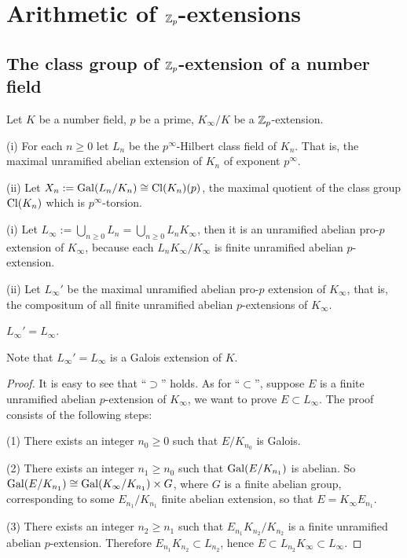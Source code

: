 \section{Arithmetic of ${\mathbb {Z}}_p$-extensions}

\subsection{The class group of ${\mathbb {Z}}_p$-extension of a number field}

Let $K$ be a number field, $p$ be a prime,
$K_\infty/K$ be a ${\mathbb {Z}}_p$-extension.

\begin{definition}
\label{Zp-ext-Ln}
{\rm(i)}
For each $n\geq 0$ let $L_n$ be the $p^\infty$-Hilbert class field of $K_n$.
That is, the maximal unramified abelian extension of $K_n$ of exponent $p^\infty$.

{\rm(ii)}
Let $X_n:={\mathrm{Gal}}(L_n/K_n)\cong{\mathrm{Cl}}(K_n)(p)$,
the maximal quotient of the class group ${\mathrm{Cl}}(K_n)$ which is $p^\infty$-torsion.
\end{definition}

\begin{definition}
\label{Zp-ext-L-inf}
{\rm(i)}
Let $L_\infty:=\bigcup_{n\geq 0}L_n=\bigcup_{n\geq 0}L_nK_\infty$,
then it is an unramified abelian pro-$p$ extension of $K_\infty$,
because each $L_nK_\infty/K_\infty$ is finite unramified abelian $p$-extension.

{\rm(ii)}
Let $L_\infty'$ be the maximal unramified abelian pro-$p$ extension of $K_\infty$,
that is, the compositum of all finite unramified abelian $p$-extensions of $K_\infty$.
\end{definition}

\begin{prop}
\label{Zp-ext-L-eq-L}
$L_\infty'=L_\infty$.
\end{prop}

Note that $L_\infty'=L_\infty$ is a Galois extension of $K$.

\begin{proof}
It is easy to see that ``$\supset$'' holds.
As for ``$\subset$'', suppose $E$ is a finite
unramified abelian $p$-extension of $K_\infty$,
we want to prove $E\subset L_\infty$. The proof consists of the following steps:

(1) There exists an integer $n_0\geq 0$ such that $E/K_{n_0}$ is Galois.

(2) There exists an integer $n_1\geq n_0$ such that ${\mathrm{Gal}}(E/K_{n_1})$ is abelian.
So ${\mathrm{Gal}}(E/K_{n_1})\cong{\mathrm{Gal}}(K_\infty/K_{n_1})\times G$,
where $G$ is a finite abelian group, corresponding to some $E_{n_1}/K_{n_1}$
finite abelian extension, so that $E=K_\infty E_{n_1}$.

(3) There exists an integer $n_2\geq n_1$ such that $E_{n_1}K_{n_2}/K_{n_2}$
is a finite unramified abelian $p$-extension. Therefore $E_{n_1}K_{n_2}\subset L_{n_2}$,
hence $E\subset L_{n_2}K_\infty\subset L_\infty$.
\end{proof}


